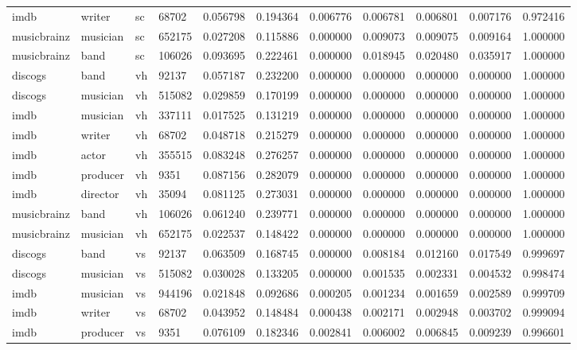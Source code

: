 \documentclass[epsfig,a4paper,11pt,titlepage,twoside,openany]{book}
\begin{document}
\begin{longtable}{|l|l|l|l|l|l|l|l|l|l|l|}
imdb        & writer   & sc      & 68702  & 0.056798 & 0.194364 & 0.006776 & 0.006781 & 0.006801 & 0.007176 & 0.972416 \\
musicbrainz & musician & sc      & 652175 & 0.027208 & 0.115886 & 0.000000 & 0.009073 & 0.009075 & 0.009164 & 1.000000 \\
musicbrainz & band     & sc      & 106026 & 0.093695 & 0.222461 & 0.000000 & 0.018945 & 0.020480 & 0.035917 & 1.000000 \\ \hline
discogs     & band     & vh & 92137  & 0.057187 & 0.232200 & 0.000000 & 0.000000 & 0.000000 & 0.000000 & 1.000000 \\
discogs     & musician & vh & 515082 & 0.029859 & 0.170199 & 0.000000 & 0.000000 & 0.000000 & 0.000000 & 1.000000 \\
imdb        & musician & vh & 337111 & 0.017525 & 0.131219 & 0.000000 & 0.000000 & 0.000000 & 0.000000 & 1.000000 \\
imdb        & writer   & vh & 68702  & 0.048718 & 0.215279 & 0.000000 & 0.000000 & 0.000000 & 0.000000 & 1.000000 \\
imdb        & actor    & vh & 355515 & 0.083248 & 0.276257 & 0.000000 & 0.000000 & 0.000000 & 0.000000 & 1.000000 \\
imdb        & producer & vh & 9351   & 0.087156 & 0.282079 & 0.000000 & 0.000000 & 0.000000 & 0.000000 & 1.000000 \\
imdb        & director & vh & 35094  & 0.081125 & 0.273031 & 0.000000 & 0.000000 & 0.000000 & 0.000000 & 1.000000 \\
musicbrainz & band     & vh & 106026 & 0.061240 & 0.239771 & 0.000000 & 0.000000 & 0.000000 & 0.000000 & 1.000000 \\
musicbrainz & musician & vh & 652175 & 0.022537 & 0.148422 & 0.000000 & 0.000000 & 0.000000 & 0.000000 & 1.000000 \\ \hline
discogs     & band     & vs & 92137  & 0.063509 & 0.168745 & 0.000000 & 0.008184 & 0.012160 & 0.017549 & 0.999697 \\
discogs     & musician & vs & 515082 & 0.030028 & 0.133205 & 0.000000 & 0.001535 & 0.002331 & 0.004532 & 0.998474 \\
imdb        & musician & vs & 944196 & 0.021848 & 0.092686 & 0.000205 & 0.001234 & 0.001659 & 0.002589 & 0.999709 \\
imdb        & writer   & vs & 68702  & 0.043952 & 0.148484 & 0.000438 & 0.002171 & 0.002948 & 0.003702 & 0.999094 \\
imdb        & producer & vs & 9351   & 0.076109 & 0.182346 & 0.002841 & 0.006002 & 0.006845 & 0.009239 & 0.996601 \\

\end{longtable}
\end{document}
